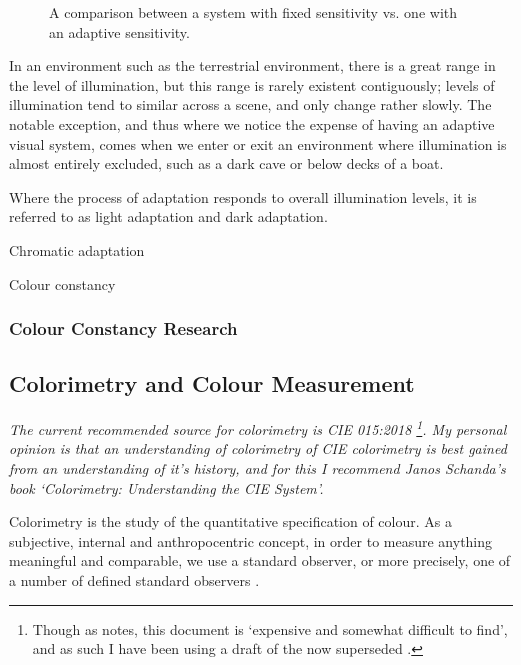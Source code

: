 \begin{figure}[htbp]
\caption{A comparison between a system with fixed sensitivity vs. one with an adaptive sensitivity.}
\label{fig:adaptation}
\end{figure}

In an environment such as the terrestrial environment, there is a great range in the level of illumination, but this range is rarely existent contiguously; levels of illumination tend to similar across a scene, and only change rather slowly. The notable exception, and thus where we notice the expense of having an adaptive visual system, comes when we enter or exit an environment where illumination is almost entirely excluded, such as a dark cave or below decks of a boat. 

Where the process of adaptation responds to overall illumination levels, it is referred to as light adaptation and dark adaptation. 

Chromatic adaptation

Colour constancy

\subsubsection{Colour Constancy Research}

\subsection{Colorimetry and Colour Measurement}

\textit{The current recommended source for colorimetry is CIE 015:2018 \citep{cie_cie_2018}\footnote{Though as \citet{fairchild_cie_2019} notes, this document is `expensive and somewhat difficult to find', and as such I have been using a draft of the now superseded \citet{cie_cie_2004-2}.}. My personal opinion is that an understanding of colorimetry of CIE colorimetry is best gained from an understanding of it's history, and for this I recommend Janos Schanda's book `Colorimetry: Understanding the CIE System'\citep{schanda_colorimetry_2007}.}

\bigskip

Colorimetry is the study of the quantitative specification of colour. As a subjective, internal and anthropocentric concept, in order to measure anything meaningful and comparable, we use a standard observer, or more precisely, one of a number of defined standard observers \cite{cie_bs_2011}.

